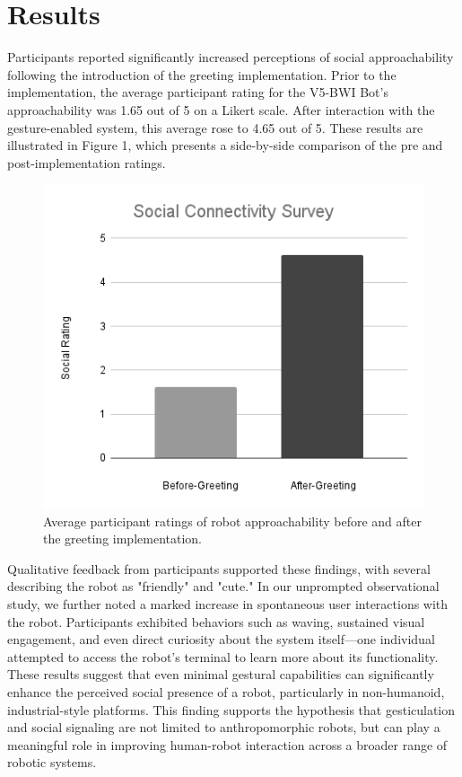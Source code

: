 \documentclass[conference]{IEEEtran}
\begin{document}
\section{Results}
Participants reported significantly increased perceptions of social approachability following the introduction of the greeting implementation. Prior to the implementation, the average participant rating for the V5-BWI Bot’s approachability was 1.65 out of 5 on a Likert scale. After interaction with the gesture-enabled system, this average rose to 4.65 out of 5. These results are illustrated in Figure 1, which presents a side-by-side comparison of the pre and post-implementation ratings.
\begin{figure}[!t]
\centering
\includegraphics[width=\linewidth]{figures/Social Connectivity Survey.png}
\caption{Average participant ratings of robot approachability before and after the greeting implementation.}
\label{fig:Social Connectivity Survey}
\end{figure}
Qualitative feedback from participants supported these findings, with several describing the robot as "friendly" and "cute." In our unprompted observational study, we further noted a marked increase in spontaneous user interactions with the robot. Participants exhibited behaviors such as waving, sustained visual engagement, and even direct curiosity about the system itself—one individual attempted to access the robot’s terminal to learn more about its functionality. These results suggest that even minimal gestural capabilities can significantly enhance the perceived social presence of a robot, particularly in non-humanoid, industrial-style platforms. This finding supports the hypothesis that gesticulation and social signaling are not limited to anthropomorphic robots, but can play a meaningful role in improving human-robot interaction across a broader range of robotic systems.
\end{document}
